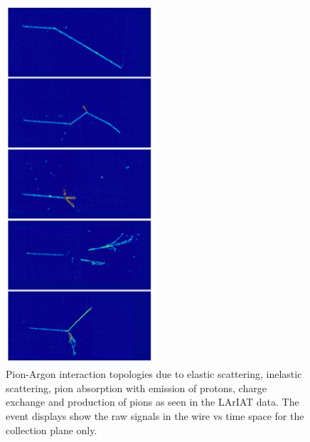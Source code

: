 \documentclass[aps,prl,twocolumn,showpacs,superscriptaddress,groupedaddress]{revtex4}  %
\begin{document}
\begin{figure}
  \centering  
\includegraphics[width =0.5\textwidth]{Evds}
\caption{Pion-Argon interaction topologies due to elastic scattering, inelastic scattering, pion absorption with emission of protons, charge exchange and production of pions as seen in the LArIAT data. The event displays show the raw signals in the wire vs time space for the collection plane only.}
\label{fig:PionsEvd}
\end{figure}
\end{document}
